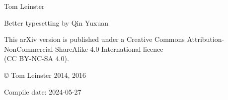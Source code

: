 % 
% 
% 

\thispagestyle{empty}

{%
\vspace*{\fill}

\hfill
{}

\vspace*{2em}
\hfill
{\LARGE Tom Leinster}

\vspace*{1em}
\hfill
{\large Better typesetting by Qin Yuxuan}

}


\newpage
\thispagestyle{empty}

{
\centering\small









This arXiv version is published under a Creative Commons
Attribution-NonCommercial-ShareAlike 4.0 International licence\\ 
(CC BY-NC-SA 4.0).




\copyright{} Tom Leinster 2014, 2016

\vspace*{4em}
Compile date: 2024-05-27

}

